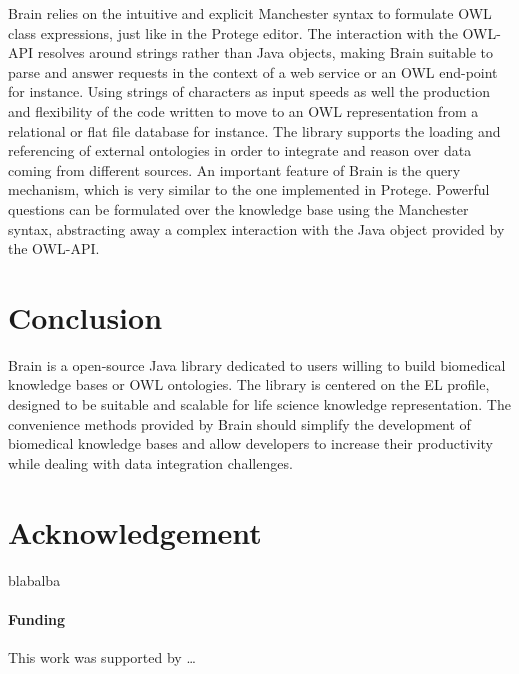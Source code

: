 \documentclass{bioinfo}
\begin{document}
Brain relies on the intuitive and explicit Manchester syntax to formulate OWL class expressions, just like in the Protege editor.
The interaction with the OWL-API resolves around strings rather than Java objects, making Brain suitable to parse and answer requests in 
the context of a web service or an OWL end-point for instance. Using strings of characters as input speeds as well the production 
and flexibility of the code written to move to an OWL representation from a relational or flat file database for instance.
The library supports the loading and referencing of external ontologies in order to integrate and reason
over data coming from different sources. An important feature of Brain is the query mechanism, which is very similar to 
the one implemented in Protege. Powerful questions can be formulated over the knowledge base using the Manchester syntax, abstracting
away a complex interaction with the Java object provided by the OWL-API.

\section{Conclusion}
Brain is a open-source Java library dedicated to users willing to build biomedical knowledge bases or OWL ontologies. 
The library is centered on the EL profile, designed to be suitable and scalable for life science knowledge representation. 
The convenience methods provided by Brain should simplify the development of biomedical knowledge bases and allow developers
to increase their productivity while dealing with data integration challenges.

\section*{Acknowledgement}
blabalba
\paragraph{Funding\textcolon}
This work was supported by …
 









\end{document}

